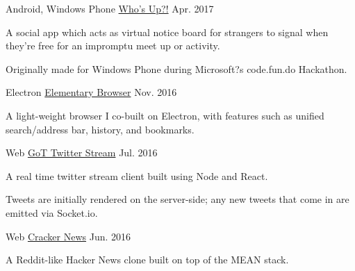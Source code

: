 

\begin{cventries}

  \cventry
    {Android, Windows Phone} %
    {\href{https://github.com/Whos-Up-Team/WhosUp}{Who's Up?!}} %
    {} %
    {Apr. 2017} %
    {
      \begin{cvitems} %
        \item {A social app which acts as virtual notice board for strangers to signal when
they're free for an impromptu meet up or activity.}
		\item {Originally made for Windows Phone during Microsoft?s code.fun.do Hackathon.}
      \end{cvitems}
    }

  \cventry
    {Electron} %
    {\href{https://github.com/azwreith/elementary-browser}{Elementary Browser}} %
    {} %
    {Nov. 2016} %
    {
      \begin{cvitems} %
        \item {A light-weight browser I co-built on Electron, with features such as unified search/address bar, history, and bookmarks.}
      \end{cvitems}
    }

  \cventry
    {Web} %
    {\href{https://github.com/azwreith/got-twitter-stream}{GoT Twitter Stream}} %
    {} %
    {Jul. 2016} %
    {
      \begin{cvitems} %
        \item {A real time twitter stream client built using Node and React.}
        \item {Tweets are initially rendered on the server-side; any new tweets that come in are emitted via Socket.io.}
      \end{cvitems}
    }

  \cventry
    {Web} %
    {\href{https://github.com/azwreith/cracker-news}{Cracker News}} %
    {} %
    {Jun. 2016} %
    {
      \begin{cvitems} %
        \item {A Reddit-like Hacker News clone built on top of the MEAN stack.}
      \end{cvitems}
    }

\end{cventries}

